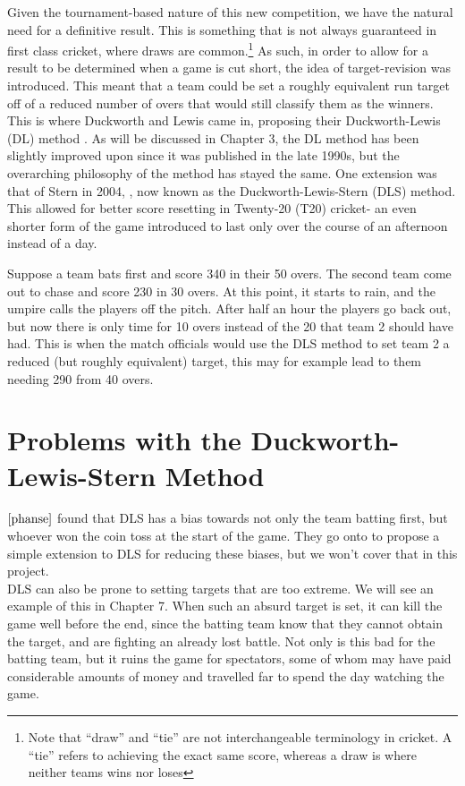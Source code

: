 Given the tournament-based nature of this new competition, we have the natural need for a definitive result.
This is something that is not always guaranteed in first class cricket, where draws are common.\footnote{Note that 
``draw'' and ``tie'' are not interchangeable terminology in cricket. A ``tie'' refers to achieving the exact same score, whereas a draw is where neither teams wins nor loses} As such, in order to allow for a result to be
determined when a game is cut short, the idea of target-revision was introduced. This meant that a team could be set a
roughly equivalent run target off of a reduced number of overs that would still classify them as the winners.
This is where Duckworth and Lewis came in, proposing their Duckworth-Lewis (DL) method \cite{duckworth}. As will be discussed in Chapter 3, the DL method 
has been slightly improved upon since it was published in the late 1990s, but the overarching philosophy of the method has stayed the same. 
One extension was that of Stern in 2004, \cite{stern}, now  known as the Duckworth-Lewis-Stern (DLS) method. This allowed for better score resetting in Twenty-20 (T20) cricket- an even shorter 
form of the game introduced to last only over the course of an afternoon instead of a day. 

\begin{example}
    Suppose a team bats first and score 340 in their 50 overs. The second team come out to chase and score 230 in 30 overs. At this point, it 
    starts to rain, and the umpire calls the players off the pitch. After half an hour the players go back out, but now there is only time for 10 overs 
    instead of the 20 that team 2 should have had. This is when the match officials would use the DLS method to set team 2 a reduced (but roughly equivalent) target, this may for example 
    lead to them needing 290 from 40 overs. 
\end{example}


\section{Problems with the Duckworth-Lewis-Stern Method}
$\cite{phanse}$ found that DLS has a bias towards not only the team batting first, but whoever won the coin toss at the start of the game.
They go onto to propose a simple extension to DLS for reducing these biases, but we won't cover that in this project. \\

DLS can also be prone to setting targets that are too extreme. We will see an example of this in Chapter 7. When such an absurd target is set, it 
can kill the game well before the end, since the batting team know that they cannot obtain the target, and are fighting an already lost battle. Not only 
is this bad for the batting team, but it ruins the game for spectators, some of whom may have paid considerable amounts of money and travelled far to spend the day watching the game. \\

